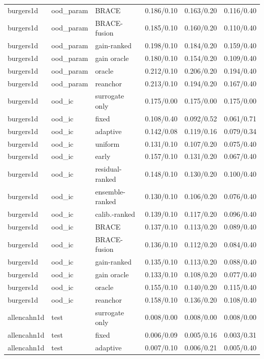 \begin{tabular}{lllrrr}
burgers1d & ood\_param & BRACE & 0.186/0.10 & 0.163/0.20 & 0.116/0.40 \\
burgers1d & ood\_param & BRACE-fusion & 0.185/0.10 & 0.160/0.20 & 0.110/0.40 \\
burgers1d & ood\_param & gain-ranked & 0.198/0.10 & 0.184/0.20 & 0.159/0.40 \\
burgers1d & ood\_param & gain oracle & 0.180/0.10 & 0.154/0.20 & 0.109/0.40 \\
burgers1d & ood\_param & oracle & 0.212/0.10 & 0.206/0.20 & 0.194/0.40 \\
burgers1d & ood\_param & reanchor & 0.213/0.10 & 0.194/0.20 & 0.167/0.40 \\
\midrule
burgers1d & ood\_ic & surrogate only & 0.175/0.00 & 0.175/0.00 & 0.175/0.00 \\
burgers1d & ood\_ic & fixed & 0.108/0.40 & 0.092/0.52 & 0.061/0.71 \\
burgers1d & ood\_ic & adaptive & 0.142/0.08 & 0.119/0.16 & 0.079/0.34 \\
burgers1d & ood\_ic & uniform & 0.131/0.10 & 0.107/0.20 & 0.075/0.40 \\
burgers1d & ood\_ic & early & 0.157/0.10 & 0.131/0.20 & 0.067/0.40 \\
burgers1d & ood\_ic & residual-ranked & 0.148/0.10 & 0.130/0.20 & 0.100/0.40 \\
burgers1d & ood\_ic & ensemble-ranked & 0.130/0.10 & 0.106/0.20 & 0.076/0.40 \\
burgers1d & ood\_ic & calib.-ranked & 0.139/0.10 & 0.117/0.20 & 0.096/0.40 \\
burgers1d & ood\_ic & BRACE & 0.137/0.10 & 0.113/0.20 & 0.089/0.40 \\
burgers1d & ood\_ic & BRACE-fusion & 0.136/0.10 & 0.112/0.20 & 0.084/0.40 \\
burgers1d & ood\_ic & gain-ranked & 0.135/0.10 & 0.113/0.20 & 0.088/0.40 \\
burgers1d & ood\_ic & gain oracle & 0.133/0.10 & 0.108/0.20 & 0.077/0.40 \\
burgers1d & ood\_ic & oracle & 0.155/0.10 & 0.140/0.20 & 0.115/0.40 \\
burgers1d & ood\_ic & reanchor & 0.158/0.10 & 0.136/0.20 & 0.108/0.40 \\
\midrule
allencahn1d & test & surrogate only & 0.008/0.00 & 0.008/0.00 & 0.008/0.00 \\
allencahn1d & test & fixed & 0.006/0.09 & 0.005/0.16 & 0.003/0.31 \\
allencahn1d & test & adaptive & 0.007/0.10 & 0.006/0.21 & 0.005/0.40 \\

\end{tabular}

